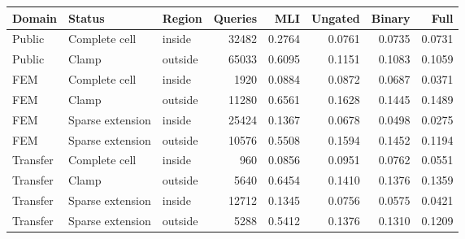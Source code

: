 \begin{tabular}{lllrrrrr}
\toprule
Domain & Status & Region & Queries & MLI & Ungated & Binary & Full \\
\midrule
Public & Complete cell & inside & 32482 & 0.2764 & 0.0761 & 0.0735 & 0.0731 \\
Public & Clamp & outside & 65033 & 0.6095 & 0.1151 & 0.1083 & 0.1059 \\
FEM & Complete cell & inside & 1920 & 0.0884 & 0.0872 & 0.0687 & 0.0371 \\
FEM & Clamp & outside & 11280 & 0.6561 & 0.1628 & 0.1445 & 0.1489 \\
FEM & Sparse extension & inside & 25424 & 0.1367 & 0.0678 & 0.0498 & 0.0275 \\
FEM & Sparse extension & outside & 10576 & 0.5508 & 0.1594 & 0.1452 & 0.1194 \\
Transfer & Complete cell & inside & 960 & 0.0856 & 0.0951 & 0.0762 & 0.0551 \\
Transfer & Clamp & outside & 5640 & 0.6454 & 0.1410 & 0.1376 & 0.1359 \\
Transfer & Sparse extension & inside & 12712 & 0.1345 & 0.0756 & 0.0575 & 0.0421 \\
Transfer & Sparse extension & outside & 5288 & 0.5412 & 0.1376 & 0.1310 & 0.1209 \\
\bottomrule
\end{tabular}
